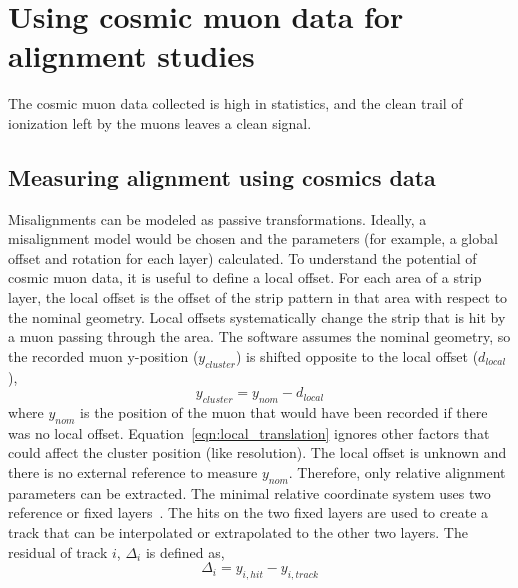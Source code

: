 
\chapter{Using cosmic muon data for alignment studies}

The cosmic muon data collected is high in statistics, and the clean trail of ionization left by the muons leaves a clean signal.

\section{Measuring alignment using cosmics data}

Misalignments can be modeled as passive transformations. Ideally, a misalignment model would be chosen and the parameters (for example, a global offset and rotation for each layer) calculated. To understand the potential of cosmic muon data, it is useful to define a local offset. For each area of a strip layer, the local offset is the offset of the strip pattern in that area with respect to the nominal geometry.  Local offsets systematically change the strip that is hit by a muon passing through the area. The  software assumes the nominal geometry, so the recorded muon y-position ($y_{cluster}$) is shifted opposite to the local offset ($d_{local}$),
\begin{equation}
    y_{cluster} = y_{nom} - d_{local}
    \label{eqn:local_translation}
\end{equation}
where $y_{nom}$ is the position of the muon that would have been recorded if there was no local offset. Equation~\ref{eqn:local_translation} ignores other factors that could affect the cluster position (like resolution). The local offset is unknown and there is no external reference to measure $y_{nom}$. Therefore, only relative alignment parameters can be extracted. The minimal relative coordinate system uses two reference or fixed layers~\cite{lefebvre_thesis}. The hits on the two fixed layers are used to create a track that can be interpolated or extrapolated to the other two layers. The residual of track $i$, $\Delta_i$ is defined as,
\begin{equation}
    \Delta_i = y_{i,hit} - y_{i,track}
    \label{eqn:residual}
\end{equation}

